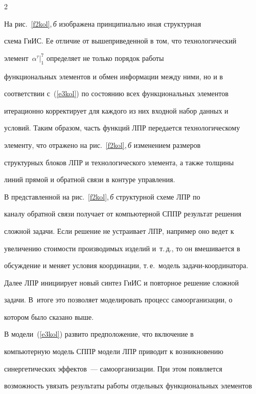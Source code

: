 \begin{multicols}{2}
  


  На рис.~\ref{f2kol},\,\textit{б} изображена принципиально иная структурная 


схема ГиИС. Ее отличие от вышеприведенной в том, что технологический 


элемент~$\alpha^\tau\vert_1^7$ определяет не только порядок работы 


функциональных элементов и обмен информации между ними, но и в 


соответствии с~(\ref{e3kol}) по состоянию всех функциональных элементов 


итерационно корректирует для каждого из них входной набор данных и 


условий. Таким образом, часть функций ЛПР передается технологическому 


элементу, что отражено на рис.~\ref{f2kol},\,\textit{б} изменением размеров 


структурных блоков ЛПР и технологического элемента, а также толщины 


линий прямой и обратной связи в контуре управления.


  


  В представленной на рис.~\ref{f2kol},\,\textit{б} структурной схеме ЛПР по 


каналу обратной связи получает от компьютерной СППР результат решения 


сложной задачи. Если решение не устраивает ЛПР, например оно ведет к 


увеличению стоимости производимых изделий и~т.\,д., то он вмешивается в 


обсуждение и меняет условия координации, т.\,е.\ модель задачи-координатора. 


Далее ЛПР инициирует новый синтез ГиИС и повторное решение сложной 


задачи. В~итоге это позволяет моделировать процесс самоорганизации, о 


котором было сказано выше.


  


  В модели~(\ref{e3kol}) развито предположение, что включение в 


компьютерную модель СППР модели ЛПР приводит к возникновению 


синергетических эффектов~--- самоорганизации. При этом появляется 


возможность увязать результаты работы отдельных функциональных элементов 



\end{multicols}
